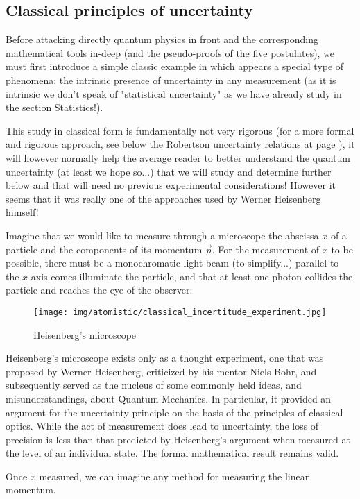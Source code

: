 	\subsection{Classical principles of uncertainty}\label{heisenberg uncertainty principle}
	Before attacking directly quantum physics in front and the corresponding mathematical tools in-deep (and the pseudo-proofs of the five postulates), we must first introduce a simple classic example in which appears a special type of phenomena: the intrinsic presence of uncertainty in any measurement (as it is intrinsic we don't speak of "statistical uncertainty" as we have already study in the section Statistics!).
	
	This study in classical form is fundamentally not very rigorous (for a more formal and rigorous approach, see below the Robertson uncertainty relations at page \pageref{Robertson uncertainty relations}), it will however normally help the average reader to better understand the quantum uncertainty (at least we hope so...) that we will study and determine further below and that will need no previous experimental considerations! However it seems that it was really one of the approaches used by Werner Heisenberg himself!
	
	Imagine that we would like to measure through a microscope the abscissa $x$ of a particle and the components of its momentum $\vec{p}$. For the measurement of $x$ to be possible, there must be a monochromatic light beam (to simplify...) parallel to the $x$-axis comes illuminate the particle, and that at least one photon collides the particle and reaches the eye of the observer: 
	\begin{figure}[H]
		\centering
		\texttt{[image: img/atomistic/classical\_incertitude\_experiment.jpg]}
		\caption{Heisenberg's microscope}
	\end{figure}
	\begin{tcolorbox}[title=Remark,colframe=black,arc=10pt]
	Heisenberg's microscope exists only as a thought experiment, one that was proposed by Werner Heisenberg, criticized by his mentor Niels Bohr, and subsequently served as the nucleus of some commonly held ideas, and misunderstandings, about Quantum Mechanics. In particular, it provided an argument for the uncertainty principle on the basis of the principles of classical optics. While the act of measurement does lead to uncertainty, the loss of precision is less than that predicted by Heisenberg's argument when measured at the level of an individual state. The formal mathematical result remains valid.
	\end{tcolorbox}
	Once $x$ measured, we can imagine any method for measuring the linear momentum.

